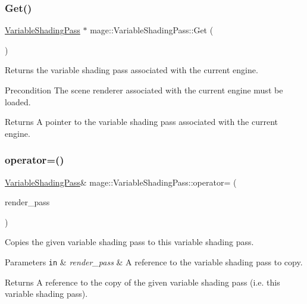 \subsubsection{\texorpdfstring{Get()}{Get()}}
{\footnotesize\ttfamily \hyperlink{classmage_1_1_variable_shading_pass}{Variable\+Shading\+Pass} $\ast$ mage\+::\+Variable\+Shading\+Pass\+::\+Get (\begin{DoxyParamCaption}{ }\end{DoxyParamCaption})\hspace{0.3cm}{\ttfamily [static]}}

Returns the variable shading pass associated with the current engine.

\begin{DoxyPrecond}{Precondition}
The scene renderer associated with the current engine must be loaded. 
\end{DoxyPrecond}
\begin{DoxyReturn}{Returns}
A pointer to the variable shading pass associated with the current engine. 
\end{DoxyReturn}
\hypertarget{classmage_1_1_variable_shading_pass_ad846c4f7ffc5b795ba1c0fa03bd6c2af}{}\label{classmage_1_1_variable_shading_pass_ad846c4f7ffc5b795ba1c0fa03bd6c2af} 
\subsubsection{\texorpdfstring{operator=()}{operator=()}\hspace{0.1cm}{\footnotesize\ttfamily [1/2]}}
{\footnotesize\ttfamily \hyperlink{classmage_1_1_variable_shading_pass}{Variable\+Shading\+Pass}\& mage\+::\+Variable\+Shading\+Pass\+::operator= (\begin{DoxyParamCaption}\item[{const \hyperlink{classmage_1_1_variable_shading_pass}{Variable\+Shading\+Pass} \&}]{render\+\_\+pass }\end{DoxyParamCaption})\hspace{0.3cm}{\ttfamily [delete]}}

Copies the given variable shading pass to this variable shading pass.


\begin{DoxyParams}[1]{Parameters}
\mbox{\tt in}  & {\em render\+\_\+pass} & A reference to the variable shading pass to copy. \\
\hline
\end{DoxyParams}
\begin{DoxyReturn}{Returns}
A reference to the copy of the given variable shading pass (i.\+e. this variable shading pass). 
\end{DoxyReturn}
\hypertarget{classmage_1_1_variable_shading_pass_a28702f255ccbbabd4b6e3177acd97a8b}{}\label{classmage_1_1_variable_shading_pass_a28702f255ccbbabd4b6e3177acd97a8b} 

